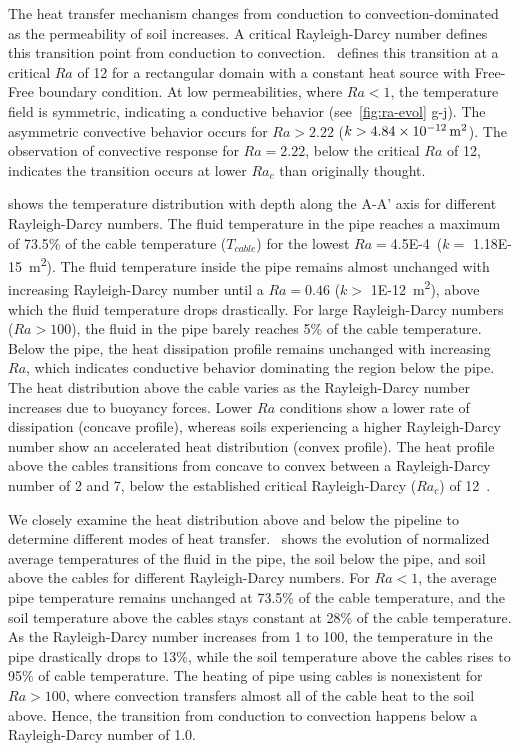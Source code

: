 \documentclass[Journal,letterpaper,InsideFigs]{ascelike-new}
\begin{document}
The heat transfer mechanism changes from conduction to convection-dominated as the permeability of soil increases. A critical Rayleigh-Darcy number defines this transition point from conduction to convection.~ defines this transition at a critical $Ra$ of 12 for a rectangular domain with a constant heat source with Free-Free boundary condition. At low permeabilities, where $Ra < 1$, the temperature field is symmetric, indicating a conductive behavior (see~\cref{fig:ra-evol} g-j). The asymmetric convective behavior occurs for $Ra > 2.22$ ($k > \SI{4.84E-12}{\meter\squared}$). The observation of convective response for $Ra = 2.22$, below the critical $Ra$ of 12, indicates the transition occurs at lower $Ra_c$ than originally thought. 

 shows the temperature distribution with depth along the A-A' axis for different Rayleigh-Darcy numbers. The fluid temperature in the pipe reaches a maximum of 73.5\% of the cable temperature ($T_{cable}$) for the lowest $Ra = $\SI{4.5E-4} ($k =$ \SI{1.18E-15}{\meter\squared}). The fluid temperature inside the pipe remains almost unchanged with increasing Rayleigh-Darcy number until a $Ra = 0.46$ ($k >$ \SI{1E-12}{\meter\squared}), above which the fluid temperature drops drastically. For large Rayleigh-Darcy numbers ($Ra > 100$), the fluid in the pipe barely reaches 5\% of the cable temperature. Below the pipe, the heat dissipation profile remains unchanged with increasing $Ra$, which indicates conductive behavior dominating the region below the pipe. The heat distribution above the cable varies as the Rayleigh-Darcy number increases due to buoyancy forces. Lower $Ra$ conditions show a lower rate of dissipation (concave profile), whereas soils experiencing a higher Rayleigh-Darcy number show an accelerated heat distribution (convex profile). The heat profile above the cables transitions from concave to convex between a Rayleigh-Darcy number of 2 and 7, below the established critical Rayleigh-Darcy ($Ra_c$) of 12~\cite{nield1968onset}. 

We closely examine the heat distribution above and below the pipeline to determine different modes of heat transfer.~ shows the evolution of normalized average temperatures of the fluid in the pipe, the soil below the pipe, and soil above the cables for different Rayleigh-Darcy numbers. For $Ra < 1$, the average pipe temperature remains unchanged at 73.5\% of the cable temperature, and the soil temperature above the cables stays constant at 28\% of the cable temperature. As the Rayleigh-Darcy number increases from 1 to 100, the temperature in the pipe drastically drops to 13\%, while the soil temperature above the cables rises to 95\% of cable temperature. The heating of pipe using cables is nonexistent for $Ra > 100$, where convection transfers almost all of the cable heat to the soil above. Hence, the transition from conduction to convection happens below a Rayleigh-Darcy number of 1.0.
\end{document}
